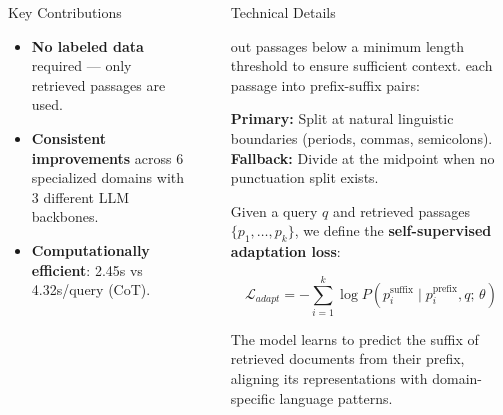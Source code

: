 \documentclass[final]{beamer}
\newlength{\sepwidth}
\newlength{\colwidth}
\newcommand{\separatorcolumn}{\begin{column}{\sepwidth}\end{column}}
\begin{document}
\begin{frame}[t]
\begin{columns}[t]
\begin{column}{\colwidth}
\begin{alertblock}{Key Contributions}
  \begin{itemize}
    \itemA \textbf{simple yet effective} test-time adaptation method for RAG via prefix-suffix self-supervised learning.
    \item\textbf{No labeled data} required --- only retrieved passages are used.
    \item\textbf{Consistent improvements} across 6 specialized domains with 3 different LLM backbones.
    \item\textbf{Computationally efficient}: 2.45s vs 4.32s/query (CoT).
  \end{itemize}

  \end{alertblock}

\end{column}

\separatorcolumn

\begin{column}{\colwidth}

  \begin{block}{Technical Details}

  \begin{itemize}
    \itemFilter out passages below a minimum length threshold to ensure sufficient context.
    \itemSplit each passage into prefix-suffix pairs:
    \begin{itemize}
      \2 \textbf{Primary:} Split at natural linguistic boundaries (periods, commas, semicolons).
      \2 \textbf{Fallback:} Divide at the midpoint when no punctuation split exists.
    \end{itemize}
  \end{itemize}


  Given a query $q$ and retrieved passages $\{p_1, \ldots, p_k\}$, we define the \textbf{self-supervised adaptation loss}:

  \begin{equation}
    \boxed{\mathcal{L}_{adapt} = -\sum_{i=1}^{k} \log P\!\left(p_i^{\text{suffix}} \mid p_i^{\text{prefix}}, q;\, \theta\right)}
  \end{equation}

  The model learns to predict the suffix of retrieved documents from their prefix, aligning its representations with domain-specific language patterns.


\end{block}
\end{column}
\end{columns}
\end{frame}
\end{document}
